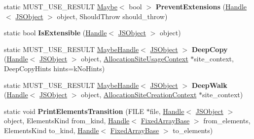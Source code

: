 \begin{DoxyCompactItemize}
\item 
static M\+U\+S\+T\+\_\+\+U\+S\+E\+\_\+\+R\+E\+S\+U\+LT \hyperlink{classv8_1_1_maybe}{Maybe}$<$ bool $>$ {\bfseries Prevent\+Extensions} (\hyperlink{classv8_1_1internal_1_1_handle}{Handle}$<$ \hyperlink{classv8_1_1internal_1_1_j_s_object}{J\+S\+Object} $>$ object, Should\+Throw should\+\_\+throw)\hypertarget{classv8_1_1internal_1_1_j_s_object_af05c52322395b156901a77e205704fda}{}\label{classv8_1_1internal_1_1_j_s_object_af05c52322395b156901a77e205704fda}

\item 
static bool {\bfseries Is\+Extensible} (\hyperlink{classv8_1_1internal_1_1_handle}{Handle}$<$ \hyperlink{classv8_1_1internal_1_1_j_s_object}{J\+S\+Object} $>$ object)\hypertarget{classv8_1_1internal_1_1_j_s_object_a018dcc60df3edec9c61cd4ab49187158}{}\label{classv8_1_1internal_1_1_j_s_object_a018dcc60df3edec9c61cd4ab49187158}

\item 
static M\+U\+S\+T\+\_\+\+U\+S\+E\+\_\+\+R\+E\+S\+U\+LT \hyperlink{classv8_1_1internal_1_1_maybe_handle}{Maybe\+Handle}$<$ \hyperlink{classv8_1_1internal_1_1_j_s_object}{J\+S\+Object} $>$ {\bfseries Deep\+Copy} (\hyperlink{classv8_1_1internal_1_1_handle}{Handle}$<$ \hyperlink{classv8_1_1internal_1_1_j_s_object}{J\+S\+Object} $>$ object, \hyperlink{classv8_1_1internal_1_1_allocation_site_usage_context}{Allocation\+Site\+Usage\+Context} $\ast$site\+\_\+context, Deep\+Copy\+Hints hints=k\+No\+Hints)\hypertarget{classv8_1_1internal_1_1_j_s_object_ac9960aabe80faad206601c372bf047fc}{}\label{classv8_1_1internal_1_1_j_s_object_ac9960aabe80faad206601c372bf047fc}

\item 
static M\+U\+S\+T\+\_\+\+U\+S\+E\+\_\+\+R\+E\+S\+U\+LT \hyperlink{classv8_1_1internal_1_1_maybe_handle}{Maybe\+Handle}$<$ \hyperlink{classv8_1_1internal_1_1_j_s_object}{J\+S\+Object} $>$ {\bfseries Deep\+Walk} (\hyperlink{classv8_1_1internal_1_1_handle}{Handle}$<$ \hyperlink{classv8_1_1internal_1_1_j_s_object}{J\+S\+Object} $>$ object, \hyperlink{classv8_1_1internal_1_1_allocation_site_creation_context}{Allocation\+Site\+Creation\+Context} $\ast$site\+\_\+context)\hypertarget{classv8_1_1internal_1_1_j_s_object_aada2466600a7a86aab516f0bbec7fa00}{}\label{classv8_1_1internal_1_1_j_s_object_aada2466600a7a86aab516f0bbec7fa00}

\item 
static void {\bfseries Print\+Elements\+Transition} (F\+I\+LE $\ast$file, \hyperlink{classv8_1_1internal_1_1_handle}{Handle}$<$ \hyperlink{classv8_1_1internal_1_1_j_s_object}{J\+S\+Object} $>$ object, Elements\+Kind from\+\_\+kind, \hyperlink{classv8_1_1internal_1_1_handle}{Handle}$<$ \hyperlink{classv8_1_1internal_1_1_fixed_array_base}{Fixed\+Array\+Base} $>$ from\+\_\+elements, Elements\+Kind to\+\_\+kind, \hyperlink{classv8_1_1internal_1_1_handle}{Handle}$<$ \hyperlink{classv8_1_1internal_1_1_fixed_array_base}{Fixed\+Array\+Base} $>$ to\+\_\+elements)\hypertarget{classv8_1_1internal_1_1_j_s_object_ae3b6b123db0ee16d21150f68d6901700}{}\label{classv8_1_1internal_1_1_j_s_object_ae3b6b123db0ee16d21150f68d6901700}


\end{DoxyCompactItemize}
